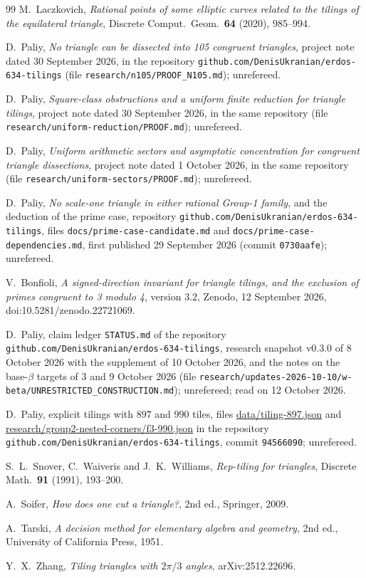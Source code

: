 \documentclass[11pt,reqno]{amsart}
\theoremstyle{plain}
\theoremstyle{definition}
\begin{document}
\begin{thebibliography}{99}
 M.~Laczkovich, \emph{Rational points of some elliptic curves related to the tilings
of the equilateral triangle}, Discrete Comput.\ Geom.\ \textbf{64} (2020), 985--994.

 D.~Paliy, \emph{No triangle can be dissected into 105 congruent triangles}, project note
dated 30 September 2026, in the repository \texttt{github.com/DenisUkranian/erdos-634-tilings} (file
\texttt{research/n105/PROOF\_N105.md}); unrefereed.

 D.~Paliy, \emph{Square-class obstructions and a uniform finite reduction for
triangle tilings}, project note dated 30 September 2026, in the same repository (file
\texttt{research/uniform-reduction/PROOF.md}); unrefereed.

 D.~Paliy, \emph{Uniform arithmetic sectors and asymptotic concentration for congruent
triangle dissections}, project note dated 1 October 2026, in the same repository (file
\texttt{research/uniform-sectors/PROOF.md}); unrefereed.

 D.~Paliy, \emph{No scale-one triangle in either rational Group-1 family}, and the
deduction of the prime case, repository \texttt{github.com/DenisUkranian/erdos-634-tilings}, files
\texttt{docs/prime-case-candidate.md} and \texttt{docs/prime-case-dependencies.md}, first published 29
September 2026 (commit \texttt{0730aafe}); unrefereed.

 V.~Bonfioli, \emph{A signed-direction invariant for triangle tilings, and the exclusion of
primes congruent to 3 modulo 4}, version 3.2, Zenodo, 12 September 2026, doi:10.5281/zenodo.22721069.

 D.~Paliy, claim ledger \texttt{STATUS.md} of the repository
\texttt{github.com/DenisUkranian/erdos-634-tilings}, research snapshot v0.3.0 of 8 October 2026 with the
supplement of 10 October 2026, and the notes on the base-$\beta$ targets of 3 and 9 October 2026 (file
\texttt{research/updates-2026-10-10/w-beta/UNRESTRICTED\_CONSTRUCTION.md}); unrefereed; read on 12 October
2026.

 D.~Paliy, explicit tilings with $897$ and $990$ tiles, files
\url{data/tiling-897.json} and \url{research/group2-nested-corners/f3-990.json} in the repository
\texttt{github.com/DenisUkranian/erdos-634-tilings}, commit \texttt{94566090}; unrefereed.

 S.~L.~Snover, C.~Waiveris and J.~K.~Williams, \emph{Rep-tiling for triangles}, Discrete
Math.\ \textbf{91} (1991), 193--200.

 A.~Soifer, \emph{How does one cut a triangle?}, 2nd ed., Springer, 2009.

 A.~Tarski, \emph{A decision method for elementary algebra and geometry}, 2nd ed.,
University of California Press, 1951.

 Y.~X.~Zhang, \emph{Tiling triangles with $2\pi/3$ angles}, arXiv:2512.22696.

\end{thebibliography}
\end{document}
